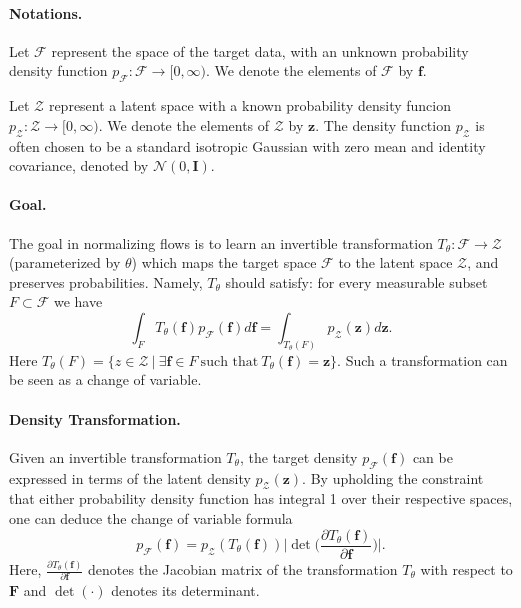 \documentclass{article}
\theoremstyle{plain}
\theoremstyle{definition}
\theoremstyle{remark}
\newcommand{\ron}[1]{{{\textcolor{red}{\textbf{[Ron:} {#1}\textbf{]}}}}}
\begin{document}
\paragraph{Notations.}
Let $\mathcal{F}$ represent the space of the target data, with an unknown probability density function $p_\mathcal{F}:\mathcal{F} \rightarrow [0,\infty)$. We denote the elements of $\mathcal{F}$ by $\mathbf{f}$.

Let $\mathcal{Z}$ represent a latent space with a known probability density funcion $p_\mathcal{Z}:\mathcal{Z} \rightarrow [0,\infty)$. We denote the elements of $\mathcal{Z}$ by $\mathbf{z}$. The density function $p_\mathcal{Z}$ is often chosen to be a standard isotropic Gaussian with zero mean and identity covariance, denoted by $\mathcal{N}(0,\mathbf{I})$. 
%

\paragraph{Goal.} The goal in normalizing flows is to learn an invertible transformation $T_\theta: \mathcal{F} \rightarrow  \mathcal{Z}$ (parameterized by $\theta$) which maps the target space $\mathcal{F}$ to the latent space $\mathcal{Z}$, and preserves probabilities. Namely, $T_{\theta}$ should satisfy: for every measurable subset $F\subset \mathcal{F}$ we have
\[\int_F T_{\theta}(\mathbf{f}) p_{\mathcal{F}}(\mathbf{f})d\mathbf{f} = \int_{T_{\theta}(F)}  p_{\mathcal{Z}}(\mathbf{z})d\mathbf{z}.\]
Here $T_{\theta}(F)= \{z\in\mathcal{Z}\ |\ \exists \mathbf{f}\in F\ {\text{such that}}\ T_{\theta}(\mathbf{f})=\mathbf{z}\}$.
Such a transformation can be seen as a change of variable.

\paragraph{Density Transformation.}
Given an invertible transformation $T_\theta$, the target density $p_\mathcal{F}(\mathbf{f})$ can be expressed in terms of the latent density $p_\mathcal{Z}(\mathbf{z})$. By upholding the constraint that either probability density function has integral 1 over their respective spaces, one can deduce the change of variable formula
\[p_\mathcal{F}(\mathbf{f}) = p_\mathcal{Z}(T_\theta(\mathbf{f})) \bigg| \det \bigg( \frac{\partial T_\theta (\mathbf{f})}{\partial  \mathbf{f}}  \bigg) \bigg|. \]
Here, $\frac{\partial T_\theta (\mathbf{f})}{\partial  \mathbf{f}}$ denotes the Jacobian matrix of the transformation $T_\theta$ with respect to $\mathbf{F}$ and $\det(\cdot)$ denotes its determinant.
\end{document}
